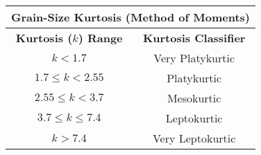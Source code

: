 \documentclass[10pt]{article}
\begin{document}
\begin{center}
\begin{tabular}{ c c  }
\multicolumn{2}{c}{\textbf{Grain-Size Kurtosis (Method of Moments) }} \\
\hline
\textbf{Kurtosis ($k$) Range} & \textbf{Kurtosis Classifier}  \\
\hline
$ k  < 1.7  $               &  Very Platykurtic   \\ 
$1.7 \le k < 2.55 $    &  Platykurtic   \\  
$2.55 \le k < 3.7 $   &  Mesokurtic  \\     
$3.7 \le k \le 7.4 $    & Leptokurtic    \\   
$k > 7.4 $    & Very Leptokurtic  \\
\end{tabular}
\end{center}
\end{document}
